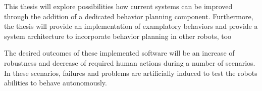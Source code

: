 %
%
%

This thesis will explore possibilities how current systems can be improved through the addition of a dedicated behavior planning component. Furthermore, the thesis will provide an implementation of examplatory behaviors and provide a system architecture to incorporate behavior planning in other robots, too

%

The desired outcomes of these implemented software will be an increase of robustness and decrease of required human actions during a number of scenarios. In these scenarios, failures and problems are artificially induced to test the robots abilities to behave autonomously. 





	
	


